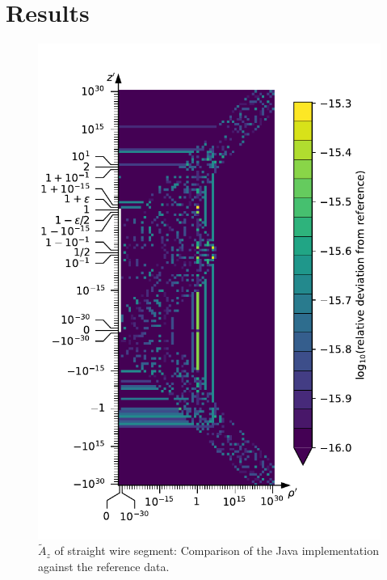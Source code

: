 \section{Results}
\label{sec:results}

\begin{figure}[htbp]
 \centering
 \includegraphics{img/StraightWireSegment_A_z_Java.pdf}
 \caption{$\tilde{A}_z$ of straight wire segment: Comparison of the Java implementation against the reference data.}
 \label{fig:StraightWireSegment_A_z_Java}
\end{figure}

